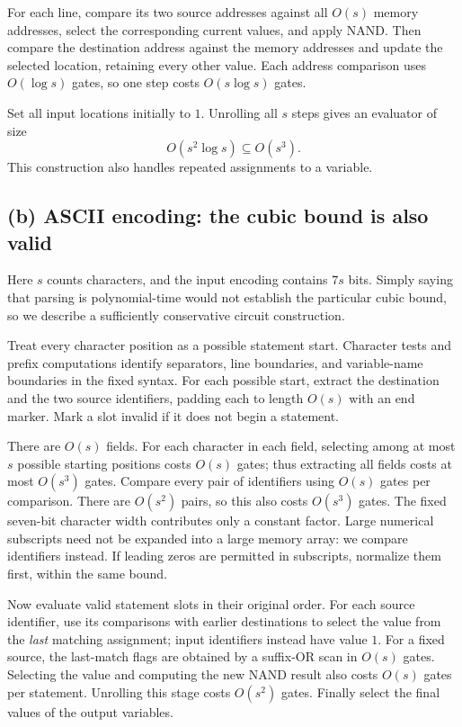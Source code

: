 \documentclass[UTF8,fontset=fandol,11pt,a4paper]{ctexart}
\begin{document}
For each line, compare its two source addresses against all $O(s)$
memory addresses, select the corresponding current values, and apply
NAND. Then compare the destination address against the memory
addresses and update the selected location, retaining every other
value. Each address comparison uses $O(\log s)$ gates, so one step
costs $O(s\log s)$ gates.

Set all input locations initially to $1$. Unrolling all $s$ steps gives
an evaluator of size
\[
 O(s^2\log s)\subseteq O(s^3).
\]
This construction also handles repeated assignments to a variable.

\subsection*{(b) ASCII encoding: the cubic bound is also valid}
Here $s$ counts characters, and the input encoding contains $7s$ bits.
Simply saying that parsing is polynomial-time would not establish
the particular cubic bound, so we describe a sufficiently conservative
circuit construction.

Treat every character position as a possible statement start.
Character tests and prefix computations identify separators, line
boundaries, and variable-name boundaries in the fixed syntax.
For each possible start, extract the destination and the two source
identifiers, padding each to length $O(s)$ with an end marker.
Mark a slot invalid if it does not begin a statement.

There are $O(s)$ fields. For each character in each field, selecting
among at most $s$ possible starting positions costs $O(s)$ gates;
thus extracting all fields costs at most $O(s^3)$ gates.
Compare every pair of identifiers using $O(s)$ gates per comparison.
There are $O(s^2)$ pairs, so this also costs $O(s^3)$ gates.
The fixed seven-bit character width contributes only a constant factor.
Large numerical subscripts need not be expanded into a large memory
array: we compare identifiers instead. If leading zeros are permitted
in subscripts, normalize them first, within the same bound.

Now evaluate valid statement slots in their original order. For each
source identifier, use its comparisons with earlier destinations to
select the value from the \emph{last} matching assignment; input
identifiers instead have value $1$. For a fixed source, the last-match
flags are obtained by a suffix-OR scan in $O(s)$ gates. Selecting the
value and computing the new NAND result also costs $O(s)$ gates per
statement. Unrolling this stage costs $O(s^2)$ gates. Finally select
the final values of the output variables.
\end{document}

